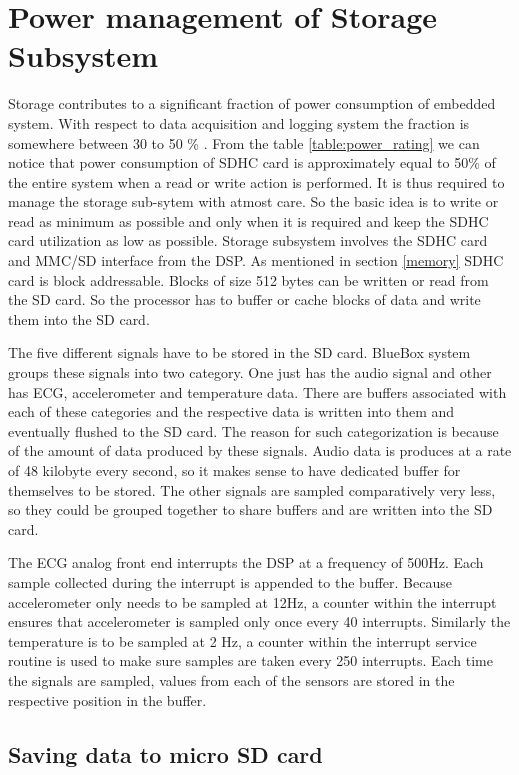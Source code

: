 \section{Power management of Storage Subsystem}
Storage contributes to a significant fraction of power consumption of embedded system. With respect to data acquisition and logging system the fraction is somewhere between 30 to 50 \% . From the table \ref{table:power_rating} we can notice that power consumption of SDHC card is approximately equal to 50\% of the entire system when a read or write action is performed. It is thus required to manage the storage sub-sytem with atmost care. So the basic idea is to write or read as minimum as possible and only when it is required and keep the SDHC card utilization as low as possible.
Storage subsystem involves the SDHC card and MMC/SD interface from the DSP. As mentioned in section \ref{memory} SDHC card is block addressable. Blocks of size 512 bytes can be written or read from the SD card. So the processor has to buffer or cache blocks of data and write them into the SD card.  

The five different signals have to be stored in the SD card. BlueBox system groups these signals into two category. One just has the audio signal and other has ECG, accelerometer and temperature data. There are buffers associated with each of these categories and the respective data is written into them and eventually flushed to the SD card. The reason for such categorization is because of the amount of data produced by these signals. Audio data is produces at a rate of 48 kilobyte every second, so it makes sense to have dedicated buffer for themselves to be stored. The other signals are sampled comparatively very less, so they could be grouped together to share buffers and are written into the SD card. 

 The ECG analog front end interrupts the DSP at a frequency of 500Hz. Each sample collected during the interrupt is appended to the buffer. Because accelerometer only needs to be sampled at 12Hz, a counter within the interrupt ensures that accelerometer is sampled only once every 40 interrupts. Similarly the temperature is to be sampled at 2 Hz, a counter within the interrupt service routine is used to make sure samples are taken every 250 interrupts. Each time the signals are sampled, values from each of the sensors are stored in the respective position in the buffer. 
\subsection{Saving data to micro SD card}

